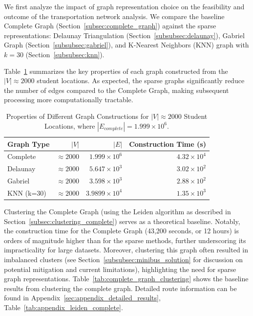 We first analyze the impact of graph representation choice on the feasibility and outcome of the transportation network analysis. We compare the baseline Complete Graph (Section~\ref{subsec:complete_graph}) against the sparse representations: Delaunay Triangulation (Section~\ref{subsubsec:delaunay}), Gabriel Graph (Section~\ref{subsubsec:gabriel}), and K-Nearest Neighbors (KNN) graph with $k=30$ (Section~\ref{subsubsec:knn}).

Table~\ref{tab:graph_properties} summarizes the key properties of each graph constructed from the $|V| \approx 2000$ student locations. As expected, the sparse graphs significantly reduce the number of edges compared to the Complete Graph, making subsequent processing more computationally tractable.

\begin{table}[h]
\centering
\label{tab:graph_properties}
\begin{tabular}{lrrr}
\toprule
Graph Type & $|V|$ & $|E|$ & Construction Time (s) \\
\midrule
Complete & $\approx 2000$ & $1.999 \times 10^{6}$ & $4.32 \times 10^{4}$ \\
Delaunay & $\approx 2000$ & $5.647 \times 10^{3}$ & $3.02 \times 10^{2}$ \\
Gabriel & $\approx 2000$ & $3.598 \times 10^{3}$ & $2.88 \times 10^{2}$ \\
KNN (k=30) & $\approx 2000$ & $3.9899 \times 10^{4}$ & $1.35 \times 10^{3}$ \\
\bottomrule
\end{tabular}
\caption{Properties of Different Graph Constructions for $|V| \approx 2000$ Student Locations, where $|E_{complete}| = 1.999 \times 10^{6}$.}
\end{table}

Clustering the Complete Graph (using the Leiden algorithm as described in Section~\ref{subsec:clustering_complete}) serves as a theoretical baseline. Notably, the construction time for the Complete Graph (43,200 seconds, or 12 hours) is orders of magnitude higher than for the sparse methods, further underscoring its impracticality for large datasets. Moreover, clustering this graph often resulted in imbalanced clusters (see Section~\ref{subsubsec:minibus_solution} for discussion on potential mitigation and current limitations), highlighting the need for sparse graph representations. Table~\ref{tab:complete_graph_clustering} shows the baseline results from clustering the complete graph. Detailed route information can be found in Appendix~\ref{sec:appendix_detailed_results}, Table~\ref{tab:appendix_leiden_complete}.

